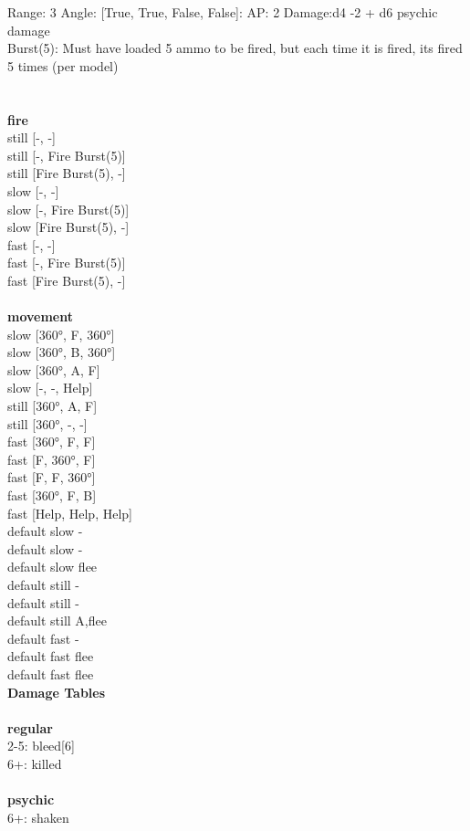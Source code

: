 Range: 3  Angle: [True, True, False, False]: AP: 2 Damage:d4 -2 + d6 psychic damage \\
Burst(5): Must have loaded 5 ammo to be fired, but each time it is fired, its fired 5 times (per model)\\ 




 
\ \\



\ \\ {\bf fire } \\
still [-, -] \\
still [-, Fire Burst(5)] \\
still [Fire Burst(5), -] \\
slow [-, -] \\
slow [-, Fire Burst(5)] \\
slow [Fire Burst(5), -] \\
fast [-, -] \\
fast [-, Fire Burst(5)] \\
fast [Fire Burst(5), -] \\
\ \\ {\bf movement } \\
slow [360°, F, 360°] \\
slow [360°, B, 360°] \\
slow [360°, A, F] \\
slow [-, -, Help] \\
still [360°, A, F] \\
still [360°, -, -] \\
fast [360°, F, F] \\
fast [F, 360°, F] \\
fast [F, F, 360°] \\
fast [360°, F, B] \\
fast [Help, Help, Help] \\
default slow - \\
default slow - \\
default slow flee \\
default still - \\
default still - \\
default still A,flee \\
default fast - \\
default fast flee \\
default fast flee \\


{\bf Damage Tables} \\
\ \\ {\bf regular } \\
2-5: bleed[6] \\
6+: killed \\
\ \\ {\bf psychic } \\
6+: shaken \\










